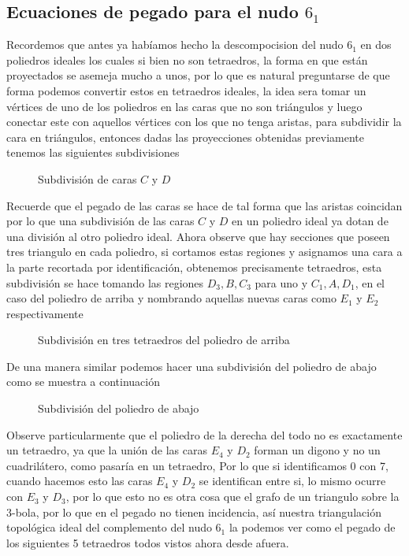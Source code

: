 \subsection{Ecuaciones de pegado para el nudo $6_1$}

Recordemos que antes ya habíamos hecho la descompocision del nudo $6_1$ en dos poliedros ideales los cuales si bien no son tetraedros, la forma en que están proyectados se asemeja mucho a unos, por lo que es natural preguntarse de que forma podemos convertir estos en tetraedros ideales, la idea sera tomar un vértices de uno de los poliedros en las caras que no son triángulos y luego conectar este con aquellos vértices con los que no tenga aristas, para subdividir la cara en triángulos, entonces dadas las proyecciones obtenidas previamente tenemos las siguientes subdivisiones
\begin{figure}[H]
\centering

    \caption{Subdivisión de caras $C$ y $D$}
\end{figure}
Recuerde que el pegado de las caras se hace de tal forma que las aristas coincidan por lo que una subdivisión de las caras $C$ y $D$ en un poliedro ideal ya dotan de una división al otro poliedro ideal. Ahora observe que hay secciones que poseen tres triangulo en cada poliedro, si cortamos estas regiones y asignamos una cara a la parte recortada por identificación, obtenemos precisamente tetraedros, esta subdivisión se hace tomando las regiones $D_3,B,C_3$ para uno y $C_1,A,D_1$, en el caso del poliedro de arriba y nombrando aquellas nuevas caras como $E_1$ y $E_2$ respectivamente
\begin{figure}[H]
\centering

    \caption{Subdivisión en tres tetraedros del poliedro de arriba}
\end{figure}
De una manera similar podemos hacer una subdivisión del poliedro de abajo como se muestra a continuación
\begin{figure}[H]
\centering

    \caption{Subdivisión del poliedro de abajo}
\end{figure}
Observe particularmente que el poliedro de la derecha del todo no es exactamente un tetraedro, ya que la unión de las caras $E_4$ y $D_2$ forman un digono y no un cuadrilátero, como pasaría en un tetraedro, Por lo que si identificamos 0 con 7, cuando hacemos esto las caras $E_4$ y $D_2$ se identifican entre si, lo mismo ocurre con $E_3$ y $D_3$, por lo que esto no es otra cosa que el grafo de un triangulo sobre la 3-bola, por lo que en el pegado no tienen incidencia, así nuestra triangulación topológica ideal del complemento del nudo $6_1$ la podemos ver como el pegado de los siguientes 5 tetraedros todos vistos ahora desde afuera.
